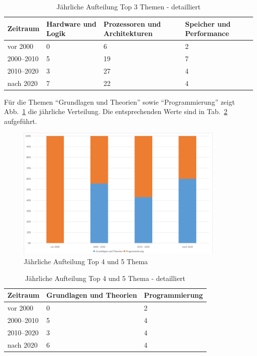 \begin{table}[htbp]
    \centering
    \begin{tabularx}{\textwidth}{lXXX}
        \hline
        \textbf{Zeitraum} & \textbf{Hardware und Logik} & \textbf{Prozessoren und Architekturen} & \textbf{Speicher und Performance} \\
        \hline
        vor 2000      & 0  & 6  & 2 \\
        2000--2010    & 5  & 19 & 7 \\
        2010--2020    & 3  & 27 & 4 \\
        nach 2020     & 7  & 22 & 4 \\
        \hline
    \end{tabularx}
    \caption{Jährliche Aufteilung Top 3 Themen - detailliert}
    \label{tab:themen-zeit}
\end{table}

Für die Themen \enquote{Grundlagen und Theorien} sowie \enquote{Programmierung} zeigt Abb.~\ref{fig:5-top5-themen} die jährliche Verteilung. Die entsprechenden Werte sind in Tab.~\ref{tab:themen-zeit-2} aufgeführt.


\begin{figure}[htbp]
    \centering
    \includegraphics[width=0.90\textwidth]{graphics/5-top5-themen-jahr.png}
    \caption{Jährliche Aufteilung Top 4 und 5 Thema}
    \label{fig:5-top5-themen}
\end{figure}

\begin{table}[htbp]
    \centering
    \tiny
    \begin{tabularx}{\textwidth}{lXX}
        \hline
        \textbf{Zeitraum} & \textbf{Grundlagen und Theorien} & \textbf{Programmierung} \\
        \hline
        vor 2000      & 0 & 2 \\
        2000--2010    & 5 & 4 \\
        2010--2020    & 3 & 4 \\
        nach 2020     & 6 & 4 \\
        \hline
    \end{tabularx}
    \caption{Jährliche Aufteilung Top 4 und 5 Thema - detailliert}
    \label{tab:themen-zeit-2}
\end{table}

